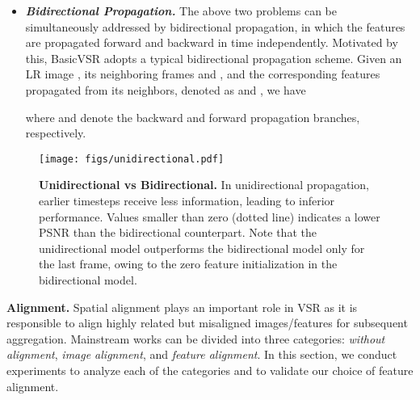 \documentclass[final]{cvpr}
\begin{document}
\begin{itemize}
	      To demonstrate the effects, we compare BasicVSR (using bidirectional propagation) with its unidirectional variant (with comparable network complexity). From Fig.~\ref{fig:unidirectional}, we see that the unidirectional model obtains a significantly lower PSNR than bidirectional propagation at early timesteps, and the difference gradually reduces as more information is aggregated with the increase in the number of frames. Moreover, a consistent performance drop of 0.5~dB is observed with only partial information employed.
These observations reveal the suboptimality of unidirectional propagation. One can improve the output quality by propagating information back from the last frame of the sequence.
	\item \textit{\textbf{Bidirectional Propagation.}}
	      The above two problems can be simultaneously addressed by bidirectional propagation, in which the features are propagated forward and backward in time independently. Motivated by this, \mbox{BasicVSR} adopts a typical bidirectional propagation scheme.
Given an LR image , its neighboring frames  and , and the corresponding features propagated from its neighbors, denoted as  and , we have
	      
	      where  and  denote the backward and forward propagation branches, respectively.
\end{itemize}

\begin{figure}[!t]
	\begin{center}
		\texttt{[image: figs/unidirectional.pdf]}
		\caption{\textbf{Unidirectional vs Bidirectional.} In unidirectional propagation, earlier timesteps receive less information, leading to inferior performance. Values smaller than zero (dotted line) indicates a lower PSNR than the bidirectional counterpart. Note that the unidirectional model outperforms the bidirectional model only for the last frame, owing to the zero feature initialization in the bidirectional model.}
		\label{fig:unidirectional}
	\end{center}
	\vspace{-0.5cm}
\end{figure}

\noindent\textbf{Alignment.} Spatial alignment plays an important role in VSR as it is responsible to align highly related but misaligned images/features for subsequent aggregation. Mainstream works can be divided into three categories: \textit{without alignment}, \textit{image alignment}, and \textit{feature alignment}. In this section, we conduct experiments to analyze each of the categories and to validate our choice of feature alignment.
\end{document}
